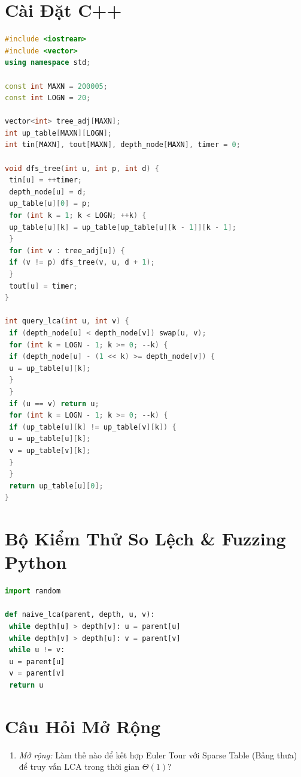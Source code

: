 \documentclass[11pt, letterpaper]{report}
\begin{document}
\section{Cài Đặt C++}
\begin{lstlisting}[language=C++, caption={C++ Binary Lifting and Euler Tour Engine}]
#include <iostream>
#include <vector>
using namespace std;

const int MAXN = 200005;
const int LOGN = 20;

vector<int> tree_adj[MAXN];
int up_table[MAXN][LOGN];
int tin[MAXN], tout[MAXN], depth_node[MAXN], timer = 0;

void dfs_tree(int u, int p, int d) {
 tin[u] = ++timer;
 depth_node[u] = d;
 up_table[u][0] = p;
 for (int k = 1; k < LOGN; ++k) {
 up_table[u][k] = up_table[up_table[u][k - 1]][k - 1];
 }
 for (int v : tree_adj[u]) {
 if (v != p) dfs_tree(v, u, d + 1);
 }
 tout[u] = timer;
}

int query_lca(int u, int v) {
 if (depth_node[u] < depth_node[v]) swap(u, v);
 for (int k = LOGN - 1; k >= 0; --k) {
 if (depth_node[u] - (1 << k) >= depth_node[v]) {
 u = up_table[u][k];
 }
 }
 if (u == v) return u;
 for (int k = LOGN - 1; k >= 0; --k) {
 if (up_table[u][k] != up_table[v][k]) {
 u = up_table[u][k];
 v = up_table[v][k];
 }
 }
 return up_table[u][0];
}
\end{lstlisting}

\section{Bộ Kiểm Thử So Lệch \& Fuzzing Python}
\begin{lstlisting}[language=Python, caption={Python Tree Ancestor Differential Testbench}]
import random

def naive_lca(parent, depth, u, v):
 while depth[u] > depth[v]: u = parent[u]
 while depth[v] > depth[u]: v = parent[v]
 while u != v:
 u = parent[u]
 v = parent[v]
 return u
\end{lstlisting}

\section{Câu Hỏi Mở Rộng}
\begin{enumerate}
 \item \textit{Mở rộng:} Làm thế nào để kết hợp Euler Tour với Sparse Table (Bảng thưa) để truy vấn LCA trong thời gian $\Theta(1)$?
\end{enumerate}
\end{document}
